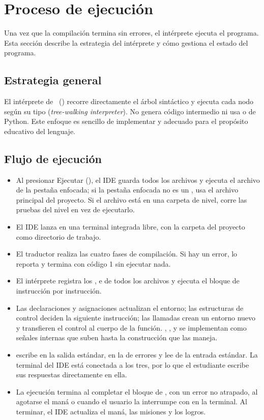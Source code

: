 \newpage
\section{Proceso de ejecución}

Una vez que la compilación termina sin errores, el intérprete ejecuta el programa. Esta sección describe la estrategia del intérprete y cómo gestiona el estado del programa.

\subsection{Estrategia general}

El intérprete de \ggez\ () recorre directamente el árbol sintáctico y ejecuta cada nodo según su tipo (\emph{tree-walking interpreter}). No genera código intermedio ni usa  o  de Python. Este enfoque es sencillo de implementar y adecuado para el propósito educativo del lenguaje.

\subsection{Flujo de ejecución}

\begin{itemize}
  \item Al presionar Ejecutar (), el IDE guarda todos los archivos y ejecuta el archivo  de la pestaña enfocada; si la pestaña enfocada no es un , usa el archivo principal del proyecto. Si el archivo está en una carpeta de nivel, corre las pruebas del nivel en vez de ejecutarlo.
  \item El IDE lanza  en una terminal integrada libre, con la carpeta del proyecto como directorio de trabajo.
  \item El traductor realiza las cuatro fases de compilación. Si hay un error, lo reporta y termina con código 1 sin ejecutar nada.
  \item El intérprete registra los ,  e  de todos los archivos y ejecuta el bloque de  instrucción por instrucción.
  \item Las declaraciones y asignaciones actualizan el entorno; las estructuras de control deciden la siguiente instrucción; las llamadas crean un entorno nuevo y transfieren el control al cuerpo de la función. , ,  y  se implementan como señales internas que suben hasta la construcción que las maneja.
  \item {} escribe en la salida estándar,  en la de errores y  lee de la entrada estándar. La terminal del IDE está conectada a los tres, por lo que el estudiante escribe sus respuestas directamente en ella.
  \item La ejecución termina al completar el bloque de , con un error no atrapado, al agotarse el maná o cuando el usuario la interrumpe con  en la terminal. Al terminar, el IDE actualiza el maná, las misiones y los logros.
\end{itemize}

